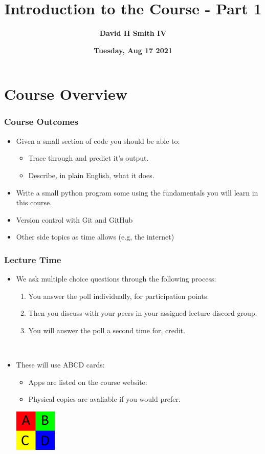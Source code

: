 \documentclass{beamer}
\title{\textbf{Introduction to the Course - Part 1}}
\author{\textbf{David H Smith IV}}
\institute[\textbf{UIUC}]{\textbf{University of Illinois Urbana-Champaign}}
\date{\textbf{Tuesday, Aug 17 2021}}
\begin{document}
\frame{\titlepage}

\section{Course Overview}

\begin{frame}
  \frametitle{Course Outcomes}
  \begin{itemize}
    \item Given a small section of code you should be able to:
      \begin{itemize}
        \item Trace through and predict it's output.
        \item Describe, in plain English, what it does.
      \end{itemize}
    \item Write a small python program some using the fundamentals you will learn in this course.
    \item Version control with Git and GitHub
    \item Other side topics as time allows (e.g, the internet)
  \end{itemize}
\end{frame}

\begin{frame}
  \frametitle{Lecture Time}
  \begin{itemize}
    \item We ask multiple choice questions through the following process:
      \begin{enumerate}
        \item You answer the poll individually, for participation points.
        \item Then you discuss with your peers in your assigned lecture discord group.
        \item You will answer the poll a second time for, credit.
      \end{enumerate}
      \\ \vfill 
    \item These will use ABCD cards:\\
      \begin{minipage}{0.45\textwidth}
        \begin{itemize}
          \item Apps are listed on the course website: 
          \item Physical copies are avaliable if you would prefer.
        \end{itemize}
      \end{minipage}
      \begin{minipage}{0.45\textwidth} 
        \includegraphics[height=75px]{./imgs/abcd.png}
      \end{minipage}
  \end{itemize}
\end{frame}
\end{document}
